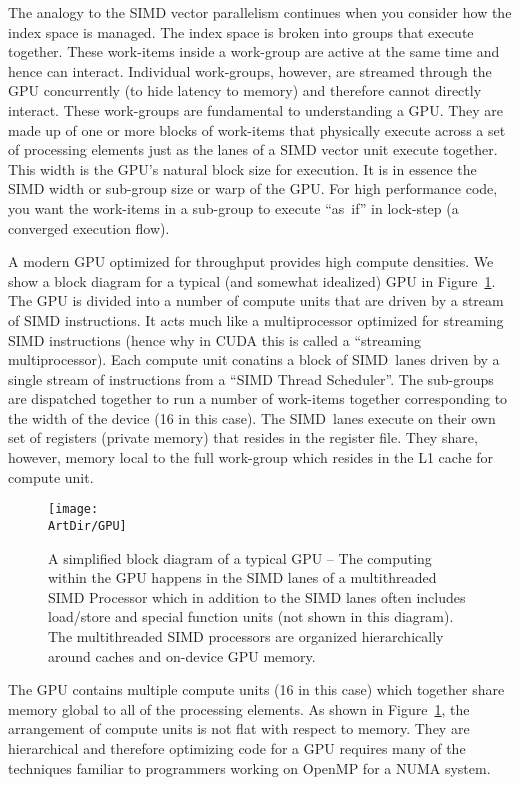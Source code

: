 The analogy to the SIMD vector parallelism continues when you consider how the index space is managed.  The 
index space is broken into groups that execute together.  These work-items inside a work-group are active
at the same time and hence can interact.  Individual work-groups, however, are streamed through the 
GPU concurrently (to hide latency to memory) and therefore cannot directly interact.   These work-groups
are fundamental to understanding a GPU.  They are made up of one or more blocks of work-items that 
physically execute across a set of processing elements just as the lanes of a SIMD vector unit execute
together.  This width is the GPU's natural block size for execution.  It is in essence the SIMD width or
sub-group size or warp of the GPU.  For high performance code, you want the work-items in a sub-group
to execute ``as~if'' in lock-step (a converged execution flow).

A modern GPU optimized for throughput provides high compute densities.  We show a block diagram 
for a typical (and somewhat idealized) GPU in Figure~\ref{figure:GPU}. The GPU is divided into a number
 of compute units that are driven by a stream of SIMD instructions.  It acts much like a multiprocessor 
 optimized for streaming SIMD instructions (hence why in CUDA this is called a ``streaming multiprocessor).
 Each compute unit conatins a block of SIMD~lanes
driven by a single stream of instructions from a ``SIMD Thread Scheduler''.  The sub-groups
are dispatched together to run a number of work-items together corresponding to the width
of the device (16 in this case).  The SIMD~lanes execute on their own set of registers (private memory)
that resides in the register file.  They share, however, memory local to the full work-group which resides 
in the L1 cache for compute unit.

\begin{figure}[!htbp]
\centerline{\texttt{[image: \\ArtDir/GPU]}}
\caption{A simplified block diagram of a typical GPU -- \small The computing within the GPU happens in the
SIMD lanes of a multithreaded SIMD Processor which in addition to the SIMD lanes often includes
load/store and special function units (not shown in this diagram).   The multithreaded SIMD processors
are organized hierarchically around caches and on-device GPU memory.}
\label{figure:GPU}
\end{figure}

The GPU contains multiple compute units (16 in this case) which together share memory global to 
all of the processing elements.  As shown in Figure~\ref{figure:GPU}, the arrangement of compute units
is not flat with respect to memory.   They are hierarchical and therefore optimizing code for a GPU requires
many of the techniques familiar to programmers working on OpenMP for a NUMA system.

